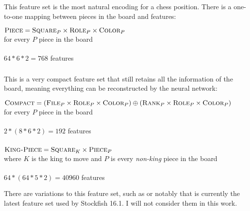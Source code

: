 \subsubsection{\mdseries{}}

This feature set is the most natural encoding for a chess position. There is a one-to-one mapping between pieces in the board and features:

\begin{center}
    $\textsc{Piece} = \textsc{Square}_{P} \times \textsc{Role}_{P} \times \textsc{Color}_{P}$ \\
    for every $P$ piece in the board \\
    ~\\
    $64*6*2=768$ features
\end{center}

\subsubsection{\mdseries{}}

This is a very compact feature set that still retains all the information of the board, meaning everything can be reconstructed by the neural network:

\begin{center}
    $\textsc{Compact} = (\textsc{File}_{P} \times \textsc{Role}_{P} \times \textsc{Color}_{P}) \oplus (\textsc{Rank}_{P} \times \textsc{Role}_{P} \times \textsc{Color}_{P})$ \\
    for every $P$ piece in the board \\
    ~\\
    $2*(8*6*2)=192$ features
\end{center}

\subsubsection{\mdseries{}}

\begin{center}
    $\textsc{King-Piece} = \textsc{Square}_{K} \times \textsc{Piece}_{P}$ \\
    where $K$ is the king to move and $P$ is every \textit{non-king} piece in the board \\
    ~\\
    $64*(64*5*2)=40960$ features
\end{center}

There are variations to this feature set, such as  or notably  that is currently the latest feature set used by Stockfish 16.1. I will not consider them in this work.

